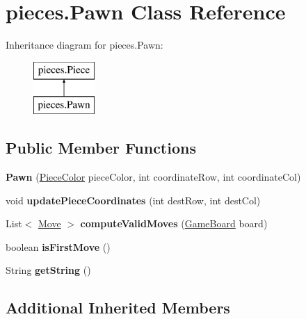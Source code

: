 \hypertarget{classpieces_1_1_pawn}{}\section{pieces.\+Pawn Class Reference}
\label{classpieces_1_1_pawn}
Inheritance diagram for pieces.\+Pawn\+:\begin{figure}[H]
\begin{center}
\leavevmode
\includegraphics[height=2.000000cm]{classpieces_1_1_pawn}
\end{center}
\end{figure}
\subsection*{Public Member Functions}
\begin{DoxyCompactItemize}
\item 
\mbox{\label{classpieces_1_1_pawn_a9165001fee7b0262ff08161b7d03f3c4}} 
{\bfseries Pawn} (\mbox{\hyperlink{enumpieces_1_1_piece_1_1_piece_color}{Piece\+Color}} piece\+Color, int coordinate\+Row, int coordinate\+Col)
\item 
\mbox{\label{classpieces_1_1_pawn_abbe6d7f66832496c1ae371d28531d608}} 
void {\bfseries update\+Piece\+Coordinates} (int dest\+Row, int dest\+Col)
\item 
\mbox{\label{classpieces_1_1_pawn_a1e49de35e9aec99eb704e9a9b3311e82}} 
List$<$ \mbox{\hyperlink{classpieces_1_1_move}{Move}} $>$ {\bfseries compute\+Valid\+Moves} (\mbox{\hyperlink{classgameboard_1_1_game_board}{Game\+Board}} board)
\item 
\mbox{\label{classpieces_1_1_pawn_af16853a3b9916d98f9874ccbceacee27}} 
boolean {\bfseries is\+First\+Move} ()
\item 
\mbox{\label{classpieces_1_1_pawn_ae5bfb4aa4e9fbbe23c313a34ba628175}} 
String {\bfseries get\+String} ()
\end{DoxyCompactItemize}
\subsection*{Additional Inherited Members}



